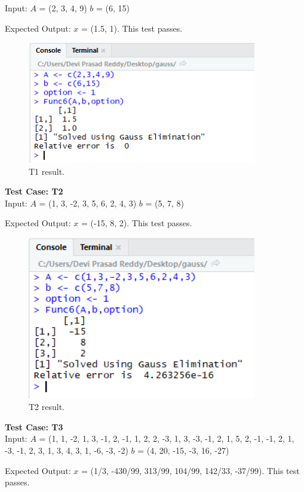 \documentclass[12pt, titlepage]{article}
\begin{document}
Input: $A$ = (2, 3, 4, 9)
$b$ = (6, 15)

Expected Output: $x$ = (1.5, 1). This test passes.

\begin{figure}[H]
\centering
 \includegraphics[width=100mm]{T1}
  \caption{T1 result.}
  \label{fig:T1}
\end{figure}

\textbf{Test Case: T2}\\

Input: $A$ = (1, 3, -2, 3, 5, 6, 2, 4, 3)
$b$ = (5, 7, 8)

Expected Output: $x$ = (-15, 8, 2). This test passes.

\begin{figure}[H]
\centering
 \includegraphics[width=100mm]{T2}
  \caption{T2 result.}
  \label{fig:T2}
\end{figure}

\textbf{Test Case: T3}\\

Input: $A$ = (1, 1, -2, 1, 3, -1, 2, -1, 1, 2, 2, -3, 1, 3, -3, -1, 2, 1, 5, 2, -1, -1, 2, 1, -3, -1, 2, 3, 1, 3, 4, 3, 1, -6, -3, -2)
$b$ = (4, 20, -15, -3, 16, -27)

Expected Output: $x$ = (1/3, -430/99, 313/99, 104/99, 142/33, -37/99). This test passes.
\end{document}

